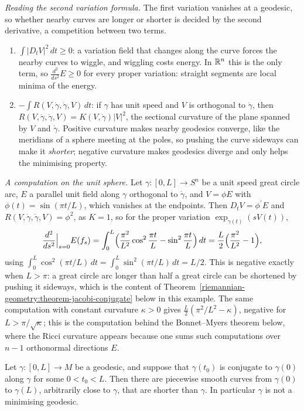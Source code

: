 \begin{remark}\label{riemannian-geometry:remark-reading-second-variation}
\emph{Reading the second variation formula.} The first variation vanishes at a geodesic, so whether nearby curves are longer or shorter is decided by the second derivative, a
competition between two terms.
\begin{enumerate}
\item $\int|D_tV|^2\,dt \geq 0$: a variation field that changes along the curve forces the nearby curves to wiggle, and wiggling costs energy. In $\mathbb{R}^n$ this is the only term, so
$\frac{d^2}{ds^2}E \geq 0$ for every proper variation: straight segments are local minima of the energy.
\item $-\int R(V, \dot\gamma, \dot\gamma, V)\,dt$: if $\gamma$ has unit speed and $V$ is orthogonal to $\dot\gamma$, then $R(V, \dot\gamma, \dot\gamma, V) = K(V, \dot\gamma)|V|^2$, the sectional
curvature of the plane spanned by $V$ and $\dot\gamma$. Positive curvature makes nearby geodesics converge, like the meridians of a sphere meeting at the poles, so pushing the curve
sideways can make it \emph{shorter}; negative curvature makes geodesics diverge and only helps the minimising property.
\end{enumerate}
\emph{A computation on the unit sphere.} Let $\gamma \colon [0, L] \to S^n$ be a unit speed great circle arc, $E$ a parallel unit field along $\gamma$ orthogonal to $\dot\gamma$, and
$V = \phi E$ with $\phi(t) = \sin(\pi t/L)$, which vanishes at the endpoints. Then $D_tV = \phi^{\prime}E$ and $R(V, \dot\gamma, \dot\gamma, V) = \phi^2$, as $K = 1$, so for the proper variation
$\exp_{\gamma(t)}(sV(t))$,
\[
\frac{d^2}{ds^2}\Big|_{s=0}E(f_s) = \int_0^L\Bigl(\frac{\pi^2}{L^2}\cos^2\frac{\pi t}{L} - \sin^2\frac{\pi t}{L}\Bigr)\,dt = \frac L2\Bigl(\frac{\pi^2}{L^2} - 1\Bigr),
\]
using $\int_0^L\cos^2(\pi t/L)\,dt = \int_0^L\sin^2(\pi t/L)\,dt = L/2$. This is negative exactly when $L > \pi$: a great circle arc longer than half a great circle can be shortened by pushing
it sideways, which is the content of Theorem~\ref{riemannian-geometry:theorem-jacobi-conjugate} below in this example. The same computation with constant curvature $\kappa > 0$ gives
$\frac L2(\pi^2/L^2 - \kappa)$, negative for $L > \pi/\sqrt\kappa$; this is the computation behind the Bonnet--Myers theorem below, where the Ricci curvature appears because one sums such
computations over $n - 1$ orthonormal directions $E$.
\end{remark}

\begin{theorem}[Jacobi]\label{riemannian-geometry:theorem-jacobi-conjugate}
Let $\gamma \colon [0, L] \to M$ be a geodesic, and suppose that $\gamma(t_0)$ is conjugate to $\gamma(0)$ along $\gamma$ for some $0 < t_0 < L$. Then there are piecewise
smooth curves from $\gamma(0)$ to $\gamma(L)$, arbitrarily close to $\gamma$, that are shorter than $\gamma$. In particular $\gamma$ is not a minimising geodesic.
\end{theorem}

